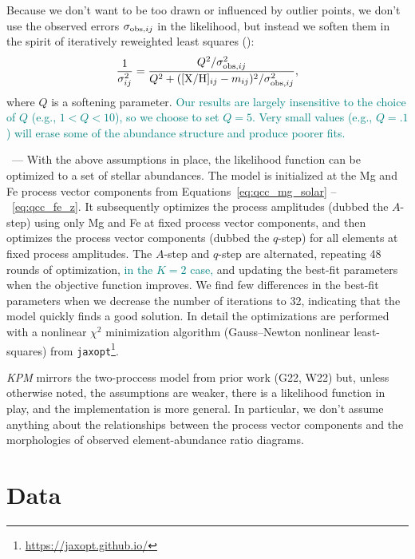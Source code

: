 \documentclass[modern]{aastex631}
\newcommand{\xh}{[{\rm X}/{\rm H}]}
\newcommand{\add}[1]{\textcolor{teal}{#1}}
\newcommand{\name}{\textsl{KPM}}
\renewcommand{\paragraph}[1]{\bigskip\par\noindent{\textbf{#1}}~---}
\begin{document}
Because we don't want to be too drawn or influenced by outlier points, we don't use the observed errors $\sigma_{{\rm obs},ij}$ in the likelihood, but instead we soften them in the spirit of iteratively reweighted least squares (\citealt{irls}):
\begin{equation}\label{eq:inflate_ivar}
    \frac{1}{\sigma_{ij}^2} = \frac{Q^2/\sigma_{{\rm obs},ij}^2}{Q^2 + (\xh_{ij} - m_{ij})^2 /\sigma_{{\rm obs},ij}^2 },    
\end{equation}
where $Q$ is a softening parameter. \add{Our results are largely insensitive to the choice of $Q$ (e.g., $1 < Q < 10$), so we choose to set $Q=5$. Very small values (e.g., $Q=.1$) will erase some of the abundance structure and produce poorer fits.}

\paragraph{9. Implementation and optimization} 
With the above assumptions in place, the likelihood function can be optimized to a set of stellar abundances.
The model is initialized at the Mg and Fe process vector components from Equations~\ref{eq:qcc_mg_solar} --~\ref{eq:qcc_fe_z}. It subsequently optimizes the process amplitudes (dubbed the $A$-step) using only Mg and Fe at fixed process vector components, and then optimizes the process vector components (dubbed the $q$-step) for all elements at fixed process amplitudes.
The $A$-step and $q$-step are alternated, repeating 48 rounds of optimization, \add{in the $K=2$ case,} and updating the best-fit parameters when the objective function improves. We find few differences in the best-fit parameters when we decrease the number of iterations to 32, indicating that the model quickly finds a good solution.  
In detail the optimizations are performed with a nonlinear $\chi^2$ minimization algorithm (Gauss--Newton nonlinear least-squares) from \texttt{jaxopt}\footnote{\url{https://jaxopt.github.io/}}.

\bigskip
\name{} mirrors the two-proccess model from prior work (G22, W22) but, unless otherwise noted, the assumptions are weaker, there is a likelihood function in play, and the implementation is more general.
In particular, we don't assume anything about the relationships between the process vector components and the morphologies of observed element-abundance ratio diagrams.

\section{Data}\label{sec:data}
\end{document}
